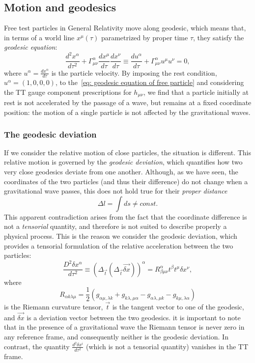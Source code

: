 \subsection{Motion and geodesics}
Free test particles in General Relativity move along geodesic, which means that, in terms of a world line $x^\mu(\tau)$ parametrized by proper time $\tau$, they satisfy the \textit{geodesic equation}:
\begin{equation}
    \frac{d^2x^\alpha}{d\tau^2} + \Gamma^\alpha_{\mu\nu} \frac{dx^\mu}{d\tau}\frac{dx^\nu}{d\tau} \equiv \frac{du^\alpha}{d\tau} + \Gamma^\alpha_{\mu\nu}u^\mu u^\nu = 0,
    \label{eq: geodesic equation of free particle}
\end{equation}
where $u^\alpha = \frac{dx^\alpha}{d\tau}$ is the particle velocity.
By imposing the rest condition, $u^\alpha = (1,0,0,0)$, to the~\eqref{eq: geodesic equation of free particle} and considering the TT gauge component prescriptions for $h_{\mu\nu}$, we find that a particle initially at rest is not accelerated by the passage of a wave, but remains at a fixed coordinate position: the motion of a single particle is not affected by the gravitational waves.

\subsubsection{The geodesic deviation}
If we consider the relative motion of close particles, the situation is different.
This relative motion is governed by the \textit{geodesic deviation}, which quantifies how two very close geodesics deviate from one another.
Although, as we have seen, the coordinates of the two particles (and thus their difference) do not change when a gravitational wave passes, this does not hold true for their \textit{proper distance}
\[
    \Delta l = \int ds \not = const.
\]
This apparent contradiction arises from the fact that the coordinate difference is not a \textit{tensorial} quantity, and therefore is not suited to describe properly a physical process.
This is the reason we consider the geodesic deviation, which provides a tensorial formulation of the relative acceleration between the two particles: 
\begin{equation}
    \frac{D^2\delta x^\alpha}{d\tau^2} \equiv (\Delta_{\vec{t}}(\Delta_{\vec{t}}\vec{\delta x}))^\alpha = R^\alpha_{\beta\mu\nu}t^\beta t^\mu \delta x^\nu,
    \label{eq: geodesic deviation}
\end{equation}
where 
\begin{equation}
    R_{\alpha k \lambda \mu} = \frac{1}{2}( g_{\alpha\mu,\lambda k}  + g_{k\lambda,\mu \alpha }  - g_{\alpha\lambda,\mu k }  - g_{k\mu,\lambda \alpha })
    \label{eq: Riemann tensor def}
\end{equation}
is the Riemann curvature tensor, $\vec{t}$ is the tangent vector to one of the geodesic, and $\vec{\delta x}$ is a deviation vector between the two geodesics.
it is important to note that in the presence of a gravitational wave the Riemann tensor is never zero in any reference frame, and consequently neither is the geodesic deviation. 
In contrast, the quantity $\frac{d^2\delta x^i}{d\tau^2}$ (which is not a tensorial quantity) vanishes in the TT frame.

